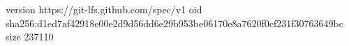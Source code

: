 version https://git-lfs.github.com/spec/v1
oid sha256:d1ed7af42918e00e2d9d56dd6e29b953be06170e8a7620f0cf231f30763649bc
size 237110
